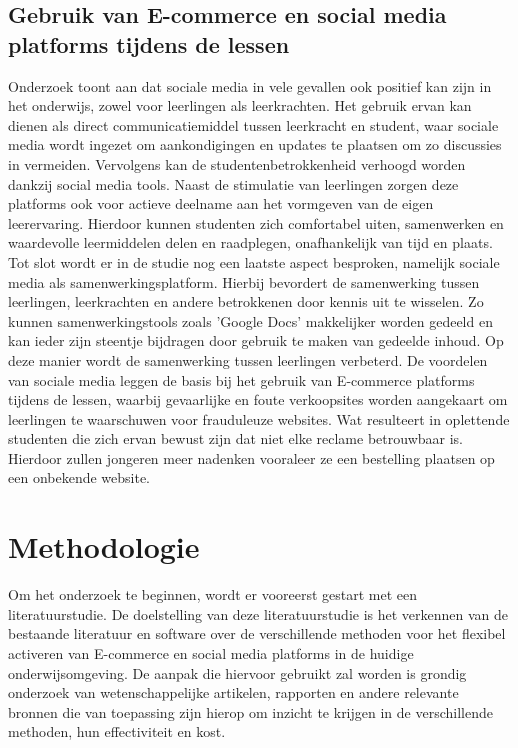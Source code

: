 \subsection{Gebruik van E-commerce en social media platforms tijdens de lessen}
Onderzoek toont aan dat sociale media in vele gevallen ook positief kan zijn in het onderwijs, zowel voor leerlingen als leerkrachten. Het gebruik ervan kan dienen als direct communicatiemiddel tussen leerkracht en student, waar sociale media wordt ingezet om aankondigingen en updates te plaatsen om zo discussies in vermeiden. 
Vervolgens kan de studentenbetrokkenheid verhoogd worden dankzij social media tools. Naast de stimulatie van leerlingen zorgen deze platforms ook voor actieve deelname aan het vormgeven van de eigen leerervaring. Hierdoor kunnen studenten zich comfortabel uiten, samenwerken en waardevolle leermiddelen delen en raadplegen, onafhankelijk van tijd en plaats. \newline
Tot slot wordt er in de studie nog een laatste aspect besproken, namelijk sociale media als samenwerkingsplatform. Hierbij bevordert de samenwerking tussen leerlingen, leerkrachten en andere betrokkenen door kennis uit te wisselen. Zo kunnen samenwerkingstools zoals 'Google Docs' makkelijker worden gedeeld en kan ieder zijn steentje bijdragen door gebruik te maken van gedeelde inhoud. Op deze manier wordt de samenwerking tussen leerlingen verbeterd. \newline
De voordelen van sociale media leggen de basis bij het gebruik van E-commerce platforms tijdens de lessen, waarbij gevaarlijke en foute verkoopsites worden aangekaart om leerlingen te waarschuwen voor frauduleuze websites. Wat resulteert in oplettende studenten die zich ervan bewust zijn dat niet elke reclame betrouwbaar is. Hierdoor zullen jongeren meer nadenken vooraleer ze een bestelling plaatsen op een onbekende website.   \autocite{benefitsofsocialmedia} \autocite{onlinefraude}


\section{Methodologie}%
\label{sec:methodologie}
Om het onderzoek te beginnen, wordt er vooreerst gestart met een literatuurstudie. De doelstelling van deze literatuurstudie is het verkennen van de bestaande literatuur en software over de verschillende methoden voor het flexibel activeren van E-commerce en social media platforms in de huidige onderwijsomgeving. De aanpak die hiervoor gebruikt zal worden is grondig onderzoek van wetenschappelijke artikelen, rapporten en andere relevante bronnen die van toepassing zijn hierop om inzicht te krijgen in de verschillende methoden, hun effectiviteit en kost. \newline

